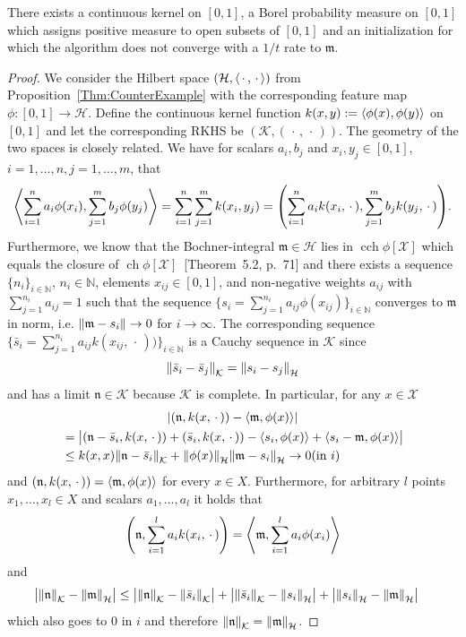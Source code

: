 \documentclass[10pt]{amsart}
\theoremstyle{definition}\newtheorem{defi}[theo]{Definition}\newtheorem{rema}[theo]{Remark}\newtheorem{exam}[theo]{Example}\newtheorem{exem}[theo]{Example}\newtheorem{nota}[theo]{Notation}
\theoremstyle{remark}
\DeclareMathOperator{\cch}{cch}
\DeclareMathOperator{\ch}{ch}
\newcommand{\bbN}{\mathbb{N}}
\newcommand{\X}{\mathcal{X}}
\newcommand{\cH}{\mathcal{H}}
\newcommand{\clK}{\mathcal{K}}
\newcommand{\fkn}{\mathfrak{n}}
\newcommand{\mean}{\mathfrak{m}}
\providecommand{\abs}[1]{\left\lvert#1\right\rvert}
\providecommand{\norm}[1]{\left\lVert#1\right\rVert}
\providecommand{\inner}[2]{\left\langle #1,#2\right\rangle}
\let\originalleft\left
\let\originalright\right
\renewcommand{\left}{\mathopen{}\mathclose\bgroup\originalleft}
\renewcommand{\right}{\aftergroup\egroup\originalright}
\begin{document}
\begin{coro}
There exists a continuous kernel on $[0,1]$, a Borel probability measure on $[0,1]$ which assigns positive measure to open subsets of $[0,1]$ and an initialization for which the algorithm does not converge with a $1/t$ rate to $\mean$.
\end{coro}
\begin{proof}
We consider the Hilbert space $(\cH,\inner{\,\cdot\,}{\,\cdot\,})$ from Proposition~\ref{Thm:CounterExample} with the corresponding feature map $\phi:[0,1] \rightarrow \cH$. Define the continuous kernel function $k(x,y) := \inner{\phi(x)}{\phi(y)}$ on $[0,1]$ and let the corresponding RKHS be $(\clK,(\,\cdot\,,\,\cdot\,))$. The geometry of the two spaces is closely related. We have for scalars $a_i, b_j$ and $x_i, y_j \in [0,1]$, $i=1,\dots,n, j=1, \dots, m$, that
\begin{align*}
\inner{\sum_{i=1}^n a_i \phi(x_i)}{\sum_{j=1}^m b_j \phi(y_j)} = \sum_{i=1}^n \sum_{j=1}^m k(x_i,y_j) =
\left(\sum_{i=1}^n a_i k(x_i,\,\cdot\,),\sum_{j=1}^m b_j k(y_j,\,\cdot\,)\right).
\end{align*}
Furthermore, we know that the Bochner-integral $\mean \in \cH$ lies in $\cch \phi[\X]$ which equals the closure of $\ch \phi[\X]$~\cite{SIM11}[Theorem~5.2, p.~71] and there exists a sequence $\{n_i\}_{i \in \bbN}$, $n_i \in \bbN$, elements $x_{ij} \in [0,1]$, and non-negative weights $a_{ij}$ with $\sum_{j=1}^{n_i} a_{ij} =1$ such that the sequence $\{s_i = \sum_{j=1}^{n_i} a_{ij} \phi(x_{ij})\}_{i\in \bbN}$ converges to $\mean$ in norm, i.e. $\norm{\mean - s_i} \rightarrow 0$ for $i\rightarrow \infty$. The corresponding sequence $\{\bar s_i = \sum_{j=1}^{n_i} a_{ij} k(x_{ij},\,\cdot\,))\}_{i\in \bbN}$ is a Cauchy sequence in $\clK$ since
\[
\norm{\bar s_i - \bar s_j}_\clK = \norm{s_i - s_j}_\cH
\]
and has a limit $\fkn \in \clK$ because $\clK$ is complete. In particular, for any $x \in \X$
\begin{multline*}
\abs{ \left(\fkn, k(x,\,\cdot\,)\right) - \inner{\mean}{\phi(x)}}\\
\begin{aligned}
&=
\bigl|(\fkn - \bar s_i,k(x,\,\cdot\,)) + (\bar s_i,k(x,\,\cdot\,)) - \inner{s_i}{\phi(x)} + \inner{s_i - \mean}{\phi(x)}\bigr| \\
&\leq k(x,x) \norm{\fkn - \bar s_i}_\clK + \norm{\phi(x)}_\cH \norm{\mean - s_i}_\cH \rightarrow 0 (\text{in } i)
\end{aligned}
\end{multline*}
and $(\fkn,k(x,\,\cdot\,)) = \inner{\mean}{\phi(x)}$ for every $x \in X$. Furthermore, for arbitrary $l$ points $x_1,\dots, x_l \in X$ and scalars $a_1,\dots,a_l$ it holds that
\[
\left(\fkn,\sum_{i=1}^l a_i k(x_i,\,\cdot\,)\right) =\left\langle \mean,\sum_{i=1}^l a_i \phi(x_i)\right\rangle
\] 
and
\begin{align*}
\bigl|\norm{\fkn}_\clK - \norm{\mean}_\cH\bigr|  &\leq \bigl|\norm{\fkn}_\clK - \norm{\bar s_i}_\clK\bigr| + \bigl|\norm{\bar s_i}_\clK - \norm{s_i}_\cH \bigr| + \bigl|\norm{s_i}_\cH - \norm{\mean}_\cH \bigr|
\end{align*}
which also goes to $0$ in $i$ and therefore $\norm{\fkn}_\clK = \norm{\mean}_\cH$.


\end{proof}
\end{document}
